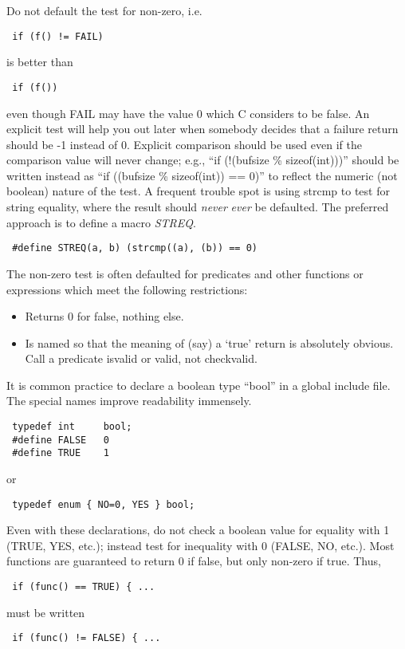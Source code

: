 Do not default the test for non-zero, i.e. 
\begin{verbatim}
 if (f() != FAIL) 
\end{verbatim}
is better than 
\begin{verbatim}
 if (f()) 
\end{verbatim}
even though FAIL may have the value 0 which C considers to be false. An
explicit test will help you out later when somebody decides that a failure
return should be -1 instead of 0. Explicit comparison should be used even if
the comparison value will never change; e.g., ``if (!(bufsize \% sizeof(int)))''
should be written instead as ``if ((bufsize \% sizeof(int)) == 0)'' to reflect
the numeric (not boolean) nature of the test. A frequent trouble spot is using
strcmp to test for string equality, where the result should {\em never} 
{\em ever} be defaulted. The preferred approach is to define a macro
 {\em STREQ}. 

\begin{verbatim}
 #define STREQ(a, b) (strcmp((a), (b)) == 0) 
\end{verbatim}

The non-zero test is often defaulted for predicates and other functions or
expressions which meet the following restrictions: 
\begin{itemize}
\item Returns 0 for false, nothing else. 

\item Is named so that the meaning of (say) a `true' return is absolutely
obvious. Call a predicate isvalid or valid, not checkvalid. 
\end{itemize}

 It is common practice to declare a boolean type ``bool'' in a global include
file. The special names improve readability immensely. 

\begin{verbatim}
 typedef int     bool;
 #define FALSE   0
 #define TRUE    1
\end{verbatim}
or 
\begin{verbatim}
 typedef enum { NO=0, YES } bool; 
\end{verbatim}

Even with these declarations, do not check a boolean value for equality with 1
(TRUE, YES, etc.); instead test for inequality with 0 (FALSE, NO, etc.). Most
functions are guaranteed to return 0 if false, but only non-zero if true. Thus,
\begin{verbatim}
 if (func() == TRUE) { ... 
\end{verbatim}
must be written 
\begin{verbatim}
 if (func() != FALSE) { ... 
\end{verbatim}

